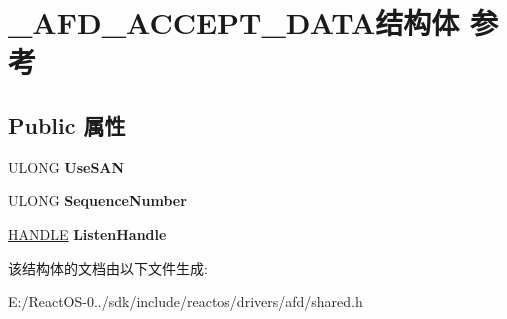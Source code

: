 \hypertarget{struct___a_f_d___a_c_c_e_p_t___d_a_t_a}{}\section{\+\_\+\+A\+F\+D\+\_\+\+A\+C\+C\+E\+P\+T\+\_\+\+D\+A\+T\+A结构体 参考}
\label{struct___a_f_d___a_c_c_e_p_t___d_a_t_a}
\subsection*{Public 属性}
\begin{DoxyCompactItemize}
\item 
\mbox{\label{struct___a_f_d___a_c_c_e_p_t___d_a_t_a_a2774910ea87dd8176262c54fe3df9dcf}} 
U\+L\+O\+NG {\bfseries Use\+S\+AN}
\item 
\mbox{\label{struct___a_f_d___a_c_c_e_p_t___d_a_t_a_af1225fb7a8cd4fad88f7bb5c5d2c6056}} 
U\+L\+O\+NG {\bfseries Sequence\+Number}
\item 
\mbox{\label{struct___a_f_d___a_c_c_e_p_t___d_a_t_a_ab2b27f6bf4c8b9232775ec24cac060dc}} 
\hyperlink{interfacevoid}{H\+A\+N\+D\+LE} {\bfseries Listen\+Handle}
\end{DoxyCompactItemize}


该结构体的文档由以下文件生成\+:\begin{DoxyCompactItemize}
\item 
E\+:/\+React\+O\+S-\/0../sdk/include/reactos/drivers/afd/shared.\+h\end{DoxyCompactItemize}
